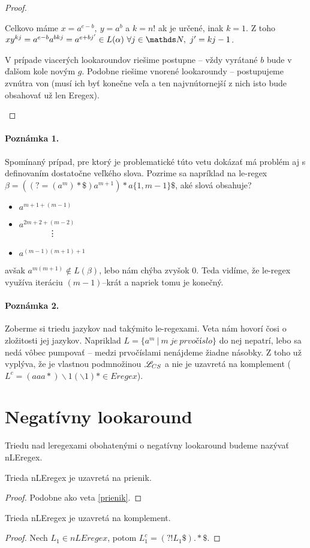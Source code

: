 \begin{proof}
\begin{enumerate}
Celkovo máme $x=a^{e-b},~y=a^b$ a $k = n!$ ak je určené, inak $k=1$. Z toho $xy^{kj} = a^{e-b}a^{bkj} = a^{e+bj'} \in L(\alpha) ~ \forall j \in \N, ~ j' = kj-1$. 

V prípade viacerých lookaroundov riešime postupne -- vždy vyrátané $b$ bude v ďalšom kole novým $g$. Podobne riešime vnorené lookaroundy -- postupujeme zvnútra von (musí ich byť konečne veľa a ten najvnútornejší z nich isto bude obsahovať už len Eregex).
\end{enumerate}
\end{proof}

\paragraph{Poznámka 1.}
Spomínaný prípad, pre ktorý je problematické túto vetu dokázať má problém aj s definovaním dostatočne veľkého slova. Pozrime sa napríklad na le-regex $\beta = ((?=(a^m)*\mathdollar )a^{m+1})*a \lbrace 1,m-1 \rbrace \mathdollar$, aké slová obsahuje?
\begin{itemize}
\item $a^{m+1+(m-1)}$
\item $a^{2m+2+(m-2)}$ \\
	  ~~~~~~~\vdots
\item $a^{(m-1)(m+1)+1}$
\end{itemize}
avšak $a^{m(m+1)} \notin L(\beta )$, lebo nám chýba zvyšok $0$. Teda vidíme, že le-regex využíva iteráciu $(m-1)$--krát a napriek tomu je konečný.

\paragraph{Poznámka 2.}
Zoberme si triedu jazykov nad takýmito le-regexami. Veta nám hovorí čosi o zložitosti jej jazykov. Napriklad $L = \lbrace a^m ~|~ m~je~prvočíslo\rbrace$ do nej nepatrí, lebo sa nedá vôbec pumpovať -- medzi prvočíslami nenájdeme žiadne násobky. Z toho už vyplýva, že je vlastnou podmnožinou $\mathscr{L}_{CS}$ a nie je uzavretá na komplement ($L^c = (aaa*)\backslash 1(\backslash1)* \in Eregex$).

\section{Negatívny lookaround}\label{chap:negla}

\begin{df}
Triedu nad leregexami obohatenými o negatívny lookaround budeme nazývať nLEregex.
\end{df}

\begin{veta}
Trieda nLEregex je uzavretá na prienik.
\end{veta}
\begin{proof}
Podobne ako veta \ref{prienik}.
\end{proof}

\begin{veta}
Trieda nLEregex je uzavretá na komplement.
\end{veta}
\begin{proof}
Nech $L_1 \in nLEregex$, potom $L_1^c  = \left( ?! L_1 \mathdollar \right) .* \mathdollar $.
\end{proof}
